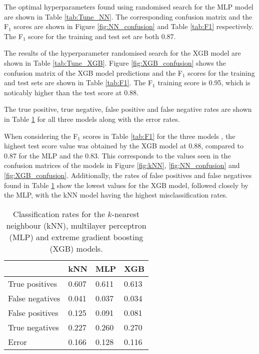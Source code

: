 \documentclass[a4paper, 11pt, twocolumn]{article}
\begin{document}
The optimal hyperparameters found using randomised search for the MLP model are 
shown in Table \ref{tab:Tune_NN}. The corresponding confusion matrix and the 
F$_1$ scores are shown in Figure \ref{fig:NN_confusion} and Table \ref{tab:F1} 
respectively. The F$_1$ score for the training and test set are both 0.87. 

The results of the hyperparameter randomised search for the XGB model are shown 
in Table \ref{tab:Tune_XGB}. Figure \ref{fig:XGB_confusion} shows the confusion 
matrix of the XGB model predictions and the F$_1$ scores for the training and 
test sets are shown in Table \ref{tab:F1}. The F$_1$ training score is 0.95, 
which is noticably higher than the test score at 0.88. 

The true positive, true negative, false positive and false negative rates are 
shown in Table \ref{tab:classification_rates} for all three models along with 
the error rates. 

When considering the F$_1$ scores in Table \ref{tab:F1} for the three models , 
the highest test score value was obtained by the XGB model at 0.88, compared to 
0.87 for the MLP and the 0.83. This corresponds to the values seen in the 
confusion matrices of the models in Figure \ref{fig:kNN}, \ref{fig:NN_confusion} 
and \ref{fig:XGB_confusion}. Additionally, the rates of false positives and 
false negatives found in Table \ref{tab:classification_rates} show the lowest 
values for the XGB model, followed closely by the MLP, with the kNN model having 
the highest misclassification rates. 

\begin{table}
\caption{Classification rates for the $k$-nearest neighbour (kNN), multilayer 
perceptron (MLP) and extreme gradient boosting (XGB) models.}
\label{tab:classification_rates}
  \begin{tabular}{|l|l|l|l|} \hline 
      & \textbf{kNN } \hspace*{2pt}& \textbf{MLP} \hspace*{2pt}& \textbf{XGB} \hspace*{2pt}\\ \hline 
      {True positives}  & 0.607 & 0.611 & 0.613 \\ \hline
      {False negatives} & 0.041 & 0.037 & 0.034 \\ \hline 
      {False positives} & 0.125 & 0.091 & 0.081 \\ \hline 
      {True negatives}  & 0.227 & 0.260 & 0.270 \\ \hline  
      Error             & 0.166 & 0.128 & 0.116 \\ \hline
  \end{tabular}
\end{table}
\end{document}
